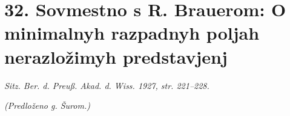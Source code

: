 \documentclass[11pt]{article}
\begin{document}

\setcounter{footnote}{0}

\section*{32. Sovmestno s R. Brauerom: O minimalnyh razpadnyh poljah nerazložimyh predstavjenj}
\begin{center}
\emph{Sitz. Ber. d. Preuß. Akad. d. Wiss. 1927, str. 221--228.}
\end{center}

\begin{center}\emph{(Predloženo g. Šurom.)}\end{center}
\end{document}
